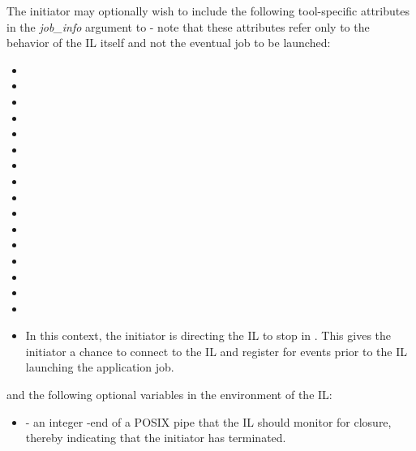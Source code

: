 The initiator may optionally wish to include the following tool-specific attributes in the \emph{job_info} argument to  - note that these attributes refer only to the behavior of the \ac{IL} itself and not the eventual job to be launched:

\begin{itemize}
    \item {}
    \item {}
    \item {}
    \item {}
    \item {}
    \item {}
    \item {}
    \item {}
    \item {}
    \item {}
    \item {}
    \item {}
    \item {}
    \item {}
    \item {}
    \item {}
    \item {}In this context, the initiator is directing the \ac{IL} to stop in . This gives the initiator a chance to connect to the \ac{IL} and register for events prior to the \ac{IL} launching the application job.
    \pasteAttributeItemEnd
\end{itemize}

and the following optional variables in the environment of the \ac{IL}:

\begin{itemize}
    \item {} - an integer -end of a POSIX pipe that the \ac{IL} should monitor for closure, thereby indicating that the initiator has terminated.
\end{itemize}

